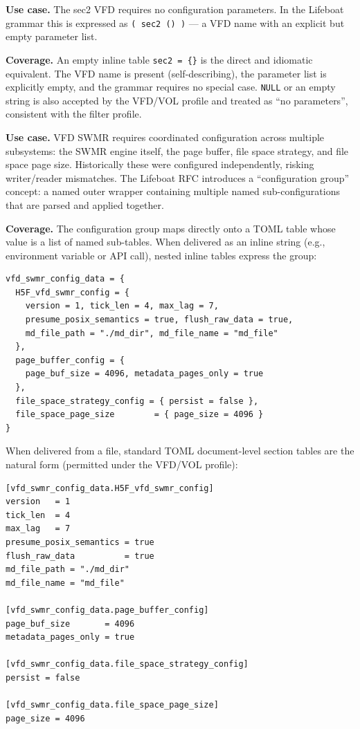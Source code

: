 \documentclass[../RFC-HDFG-2026-001.tex]{subfiles}
\begin{document}

\textbf{Use case.}  The sec2 VFD requires no configuration parameters.  In
the Lifeboat grammar this is expressed as \texttt{( sec2 () )} --- a VFD name
with an explicit but empty parameter list.

\textbf{Coverage.}  An empty inline table \texttt{sec2 = \{\}} is
the direct and idiomatic equivalent.  The VFD name is present (self-describing),
the parameter list is explicitly empty, and the grammar requires no special
case.  \texttt{NULL} or an empty string is also accepted by the VFD/VOL
profile and treated as ``no parameters'', consistent with the filter profile.


\textbf{Use case.}  VFD SWMR requires coordinated configuration across
multiple subsystems: the SWMR engine itself, the page buffer, file space
strategy, and file space page size.  Historically these were configured
independently, risking writer/reader mismatches.  The Lifeboat RFC introduces
a ``configuration group'' concept: a named outer wrapper containing multiple
named sub-configurations that are parsed and applied together.

\textbf{Coverage.}  The configuration group maps directly onto a
TOML table whose value is a list of named sub-tables.  When delivered as an
inline string (e.g., environment variable or API call), nested inline tables
express the group:

\begin{verbatim}
vfd_swmr_config_data = {
  H5F_vfd_swmr_config = {
    version = 1, tick_len = 4, max_lag = 7,
    presume_posix_semantics = true, flush_raw_data = true,
    md_file_path = "./md_dir", md_file_name = "md_file"
  },
  page_buffer_config = {
    page_buf_size = 4096, metadata_pages_only = true
  },
  file_space_strategy_config = { persist = false },
  file_space_page_size        = { page_size = 4096 }
}
\end{verbatim}

When delivered from a file, standard TOML document-level section tables are
the natural form (permitted under the VFD/VOL profile):

\begin{verbatim}
[vfd_swmr_config_data.H5F_vfd_swmr_config]
version   = 1
tick_len  = 4
max_lag   = 7
presume_posix_semantics = true
flush_raw_data          = true
md_file_path = "./md_dir"
md_file_name = "md_file"

[vfd_swmr_config_data.page_buffer_config]
page_buf_size       = 4096
metadata_pages_only = true

[vfd_swmr_config_data.file_space_strategy_config]
persist = false

[vfd_swmr_config_data.file_space_page_size]
page_size = 4096
\end{verbatim}
\end{document}
